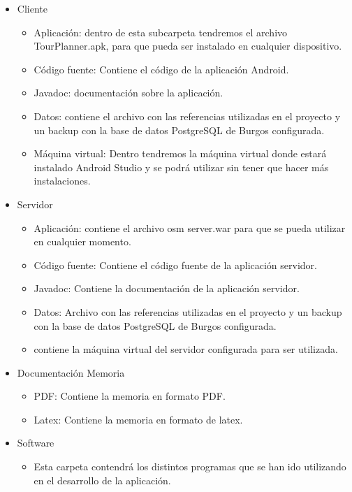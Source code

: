 \begin{itemize}
\item Cliente
 	\begin{itemize}
		\item Aplicación: dentro de esta subcarpeta tendremos el archivo TourPlanner.apk, para que pueda ser instalado en cualquier dispositivo.
		\item Código fuente: Contiene el código de la aplicación Android.
		\item Javadoc: documentación sobre la aplicación.
		\item Datos: contiene el archivo con las referencias utilizadas en el proyecto y un backup con la base de datos PostgreSQL de Burgos configurada.
		\item Máquina virtual: Dentro tendremos la máquina virtual donde estará instalado Android Studio y se podrá utilizar sin tener que hacer más instalaciones.
		\end{itemize}
		
\item Servidor
 	\begin{itemize}
		\item Aplicación: contiene el archivo osm server.war para que se pueda utilizar en cualquier momento.
		\item Código fuente: Contiene el código fuente de la aplicación servidor.
		\item Javadoc: Contiene la documentación de la aplicación servidor.
		\item Datos: Archivo con las referencias utilizadas en el proyecto y un backup con la base de datos PostgreSQL de Burgos configurada.
		\item contiene la máquina virtual del servidor configurada para ser utilizada.
		\end{itemize}
		
\item Documentación Memoria
 	\begin{itemize}	
		\item PDF: Contiene la memoria en formato PDF.
		\item Latex: Contiene la memoria en formato de latex.
		\end{itemize}
		
\item Software
 	\begin{itemize}
		\item Esta carpeta contendrá los distintos programas que se han ido utilizando en el desarrollo de la aplicación.
		\end{itemize}		
\end{itemize}

